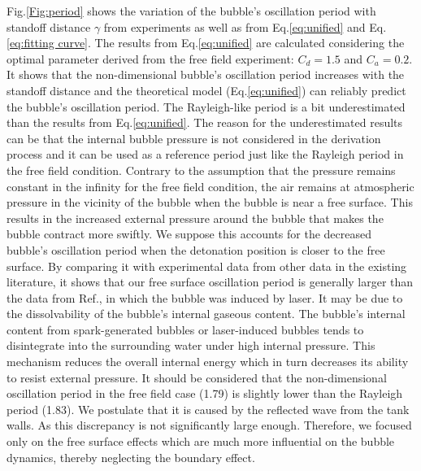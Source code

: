 \documentclass[%
 aip,
 amsmath,amssymb,
 reprint,%
]{revtex4-1}
\begin{document}
{Fig.\ref{Fig:period} shows the variation of the bubble's oscillation period with standoff distance $\gamma$ from experiments as well as from Eq.\eqref{eq:unified} and Eq.\eqref{eq:fitting curve}. The results from Eq.\eqref{eq:unified} are calculated considering the optimal parameter derived from the free field experiment: $C_d=1.5$ and $C_a=0.2$. It shows that the non-dimensional bubble's oscillation period increases with the standoff distance and the theoretical model (Eq.\ref{eq:unified}) can reliably predict the bubble's oscillation period. The Rayleigh-like period is a bit underestimated than the results from Eq.\eqref{eq:unified}. The reason for the underestimated results can be that the internal bubble pressure is not considered in the derivation process and it can be used as a reference period just like the Rayleigh period in the free field condition. Contrary to the assumption that the pressure remains constant in the infinity for the free field condition, the air remains at atmospheric pressure in the vicinity of the bubble when the bubble is near a free surface. This results in the increased external pressure around the bubble that makes the bubble contract more swiftly. We suppose this accounts for the decreased bubble's oscillation period when the detonation position is closer to the free surface. By comparing it with experimental data from other data in the existing literature, it shows that our free surface oscillation period is generally larger than the data from Ref.\cite{RN2614}, in which the bubble was induced by laser. It may be due to the dissolvability of the bubble's internal gaseous content. The bubble's internal content from spark-generated bubbles or laser-induced bubbles tends to disintegrate into the surrounding water under high internal pressure. This mechanism reduces the overall internal energy which in turn decreases its ability to resist external pressure. It should be considered that the non-dimensional oscillation period in the free field case (1.79) is slightly lower than the Rayleigh period (1.83). We postulate that it is caused by the reflected wave from the tank walls. As this discrepancy is not significantly large enough. Therefore, we focused only on the free surface effects which are much more influential on the bubble dynamics, thereby neglecting the boundary effect. 

}
\end{document}
